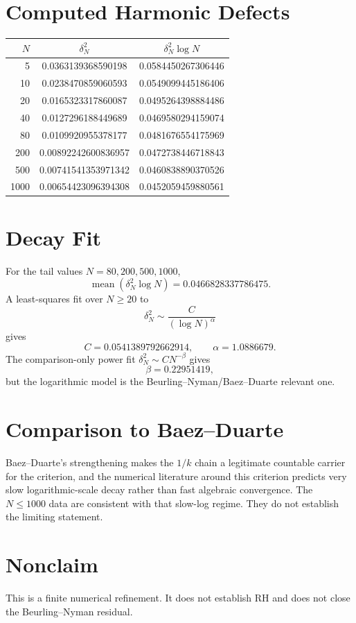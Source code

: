 \documentclass[11pt]{article}
\begin{document}
\section*{Computed Harmonic Defects}

\begin{center}
\begin{tabular}{rcc}
\(N\) & \(\delta_N^2\) & \(\delta_N^2\log N\)\\
\hline
5 & 0.0363139368590198 & 0.0584450267306446\\
10 & 0.0238470859060593 & 0.0549099445186406\\
20 & 0.0165323317860087 & 0.0495264398884486\\
40 & 0.0127296188449689 & 0.0469580294159074\\
80 & 0.0109920955378177 & 0.0481676554175969\\
200 & 0.00892242600836957 & 0.0472738446718843\\
500 & 0.00741541353971342 & 0.0460838890370526\\
1000 & 0.00654423096394308 & 0.0452059459880561\\
\end{tabular}
\end{center}

\section*{Decay Fit}

For the tail values \(N=80,200,500,1000\),
\[
\operatorname{mean}(\delta_N^2\log N)
=
0.0466828337786475.
\]
A least-squares fit over \(N\ge20\) to
\[
\delta_N^2\sim \frac{C}{(\log N)^\alpha}
\]
gives
\[
C=0.0541389792662914,
\qquad
\alpha=1.0886679.
\]
The comparison-only power fit \(\delta_N^2\sim C N^{-\beta}\) gives
\[
\beta=0.22951419,
\]
but the logarithmic model is the Beurling--Nyman/Baez--Duarte relevant one.

\section*{Comparison to Baez--Duarte}

Baez--Duarte's strengthening makes the \(1/k\) chain a legitimate countable carrier for the criterion, and the numerical literature around this criterion predicts very slow logarithmic-scale decay rather than fast algebraic convergence.  The \(N\le1000\) data are consistent with that slow-log regime.  They do not establish the limiting statement.

\section*{Nonclaim}

This is a finite numerical refinement.  It does not establish RH and does not close the Beurling--Nyman residual.
\end{document}
